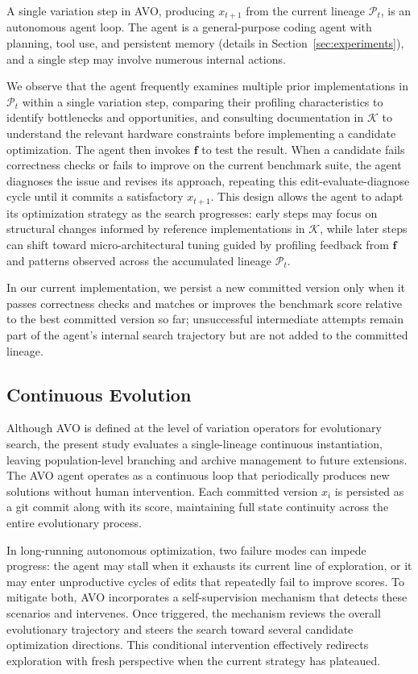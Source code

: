 \documentclass{article}
\begin{document}
A single variation step in AVO, producing $x_{t+1}$ from the current lineage $\mathcal{P}_t$, is an autonomous agent loop.
The agent is a general-purpose coding agent with planning, tool use, and persistent memory (details in Section~\ref{sec:experiments}), and a single step may involve numerous internal actions.

We observe that the agent frequently examines multiple prior implementations in $\mathcal{P}_t$ within a single variation step, comparing their profiling characteristics to identify bottlenecks and opportunities, and consulting documentation in $\mathcal{K}$ to understand the relevant hardware constraints before implementing a candidate optimization.
The agent then invokes $\mathbf{f}$ to test the result.
When a candidate fails correctness checks or fails to improve on the current benchmark suite, the agent diagnoses the issue and revises its approach, repeating this edit-evaluate-diagnose cycle until it commits a satisfactory $x_{t+1}$.
This design allows the agent to adapt its optimization strategy as the search progresses: early steps may focus on structural changes informed by reference implementations in $\mathcal{K}$, while later steps can shift toward micro-architectural tuning guided by profiling feedback from $\mathbf{f}$ and patterns observed across the accumulated lineage $\mathcal{P}_t$.

In our current implementation, we persist a new committed version only when it passes correctness checks and matches or improves the benchmark score relative to the best committed version so far; unsuccessful intermediate attempts remain part of the agent’s internal search trajectory but are not added to the committed lineage.

\subsection{Continuous Evolution}
\label{sec:method_loop}

Although AVO is defined at the level of variation operators for evolutionary search, the present study evaluates a single-lineage continuous instantiation, leaving population-level branching and archive management to future extensions.
The AVO agent operates as a continuous loop that periodically produces new solutions without human intervention.
Each committed version $x_i$ is persisted as a git commit along with its score, maintaining full state continuity across the entire evolutionary process.

In long-running autonomous optimization, two failure modes can impede progress: the agent may stall when it exhausts its current line of exploration, or it may enter unproductive cycles of edits that repeatedly fail to improve scores.
To mitigate both, AVO incorporates a self-supervision mechanism that detects these scenarios and intervenes. Once triggered, the mechanism reviews the overall evolutionary trajectory and steers the search toward several candidate optimization directions. This conditional intervention effectively redirects exploration with fresh perspective when the current strategy has plateaued.
\end{document}

